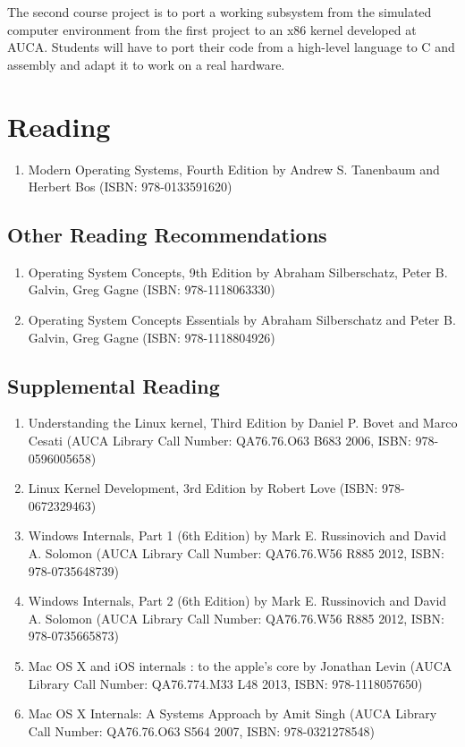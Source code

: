 \documentclass[12pt,a4paper,oneside]{article}
\begin{document}
        The second course project is to port a working subsystem from the
        simulated computer environment from the first project to an x86 kernel
        developed at AUCA. Students will have to port their code from a
        high-level language to C and assembly and adapt it to work on a real
        hardware.

    \section{Reading}
        \begin{enumerate}
            \item Modern Operating Systems, Fourth Edition by Andrew S.
            Tanenbaum and Herbert Bos (ISBN: 978-0133591620)
        \end{enumerate}

        \subsection{Other Reading Recommendations}
            \begin{enumerate}
                \item Operating System Concepts, 9th Edition by Abraham
                Silberschatz, Peter B. Galvin, Greg Gagne (ISBN: 978-1118063330)
                \item Operating System Concepts Essentials by Abraham Silberschatz and Peter B. Galvin, Greg Gagne
                (ISBN: 978-1118804926)
            \end{enumerate}

        \subsection{Supplemental Reading}
            \begin{enumerate}
                \item Understanding the Linux kernel, Third Edition by Daniel P.
                Bovet and Marco Cesati (AUCA Library Call Number: QA76.76.O63
                B683 2006, ISBN: 978-0596005658)
                \item Linux Kernel Development, 3rd Edition by Robert Love
                (ISBN: 978-0672329463)
                \item Windows Internals, Part 1 (6th Edition) by Mark E.
                Russinovich and David A. Solomon (AUCA Library Call Number:
                QA76.76.W56 R885 2012, ISBN: 978-0735648739)
                \item Windows Internals, Part 2 (6th Edition) by Mark E.
                Russinovich and David A. Solomon (AUCA Library Call Number:
                QA76.76.W56 R885 2012, ISBN: 978-0735665873)
                \item Mac OS X and iOS internals : to the apple's core by
                Jonathan Levin (AUCA Library Call Number: QA76.774.M33 L48 2013,
                ISBN: 978-1118057650)
                \item Mac OS X Internals: A Systems Approach by Amit Singh (AUCA
                Library Call Number: QA76.76.O63 S564 2007, ISBN:
                978-0321278548)
            \end{enumerate}
\end{document}
